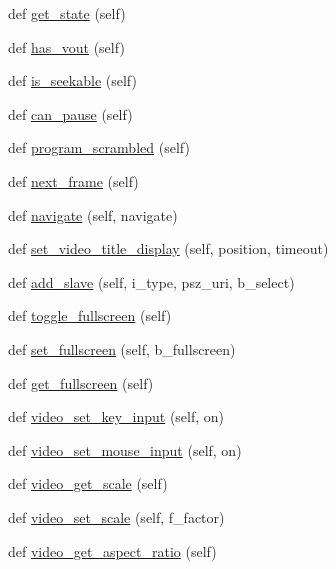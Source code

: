 \begin{DoxyCompactItemize}
def \hyperlink{classvlc_1_1_media_player_adf1f4fd59e6ea40d38c2b677a757007f}{get\+\_\+state} (self)
\item 
def \hyperlink{classvlc_1_1_media_player_a7a943244b82efa08b86d89339de2319c}{has\+\_\+vout} (self)
\item 
def \hyperlink{classvlc_1_1_media_player_aae750b3662aafae640c06bffd15b4c7c}{is\+\_\+seekable} (self)
\item 
def \hyperlink{classvlc_1_1_media_player_a134c27b04cf84027842f7e0a830908e7}{can\+\_\+pause} (self)
\item 
def \hyperlink{classvlc_1_1_media_player_ab21e3e8564c32ce300d90fac7fb18a99}{program\+\_\+scrambled} (self)
\item 
def \hyperlink{classvlc_1_1_media_player_a702101a1321786e2dab4c8a342b73ca0}{next\+\_\+frame} (self)
\item 
def \hyperlink{classvlc_1_1_media_player_ac74a3e90cc0bce1cb4e98a8c95977ffd}{navigate} (self, navigate)
\item 
def \hyperlink{classvlc_1_1_media_player_afb770de67353fac470a84cb5e15366fa}{set\+\_\+video\+\_\+title\+\_\+display} (self, position, timeout)
\item 
def \hyperlink{classvlc_1_1_media_player_a19d8a1e64748a83dced6420ae1d98de8}{add\+\_\+slave} (self, i\+\_\+type, psz\+\_\+uri, b\+\_\+select)
\item 
def \hyperlink{classvlc_1_1_media_player_aadd20ddbe69aacc041317f017debc750}{toggle\+\_\+fullscreen} (self)
\item 
def \hyperlink{classvlc_1_1_media_player_ae0b0d98dfef2ddc6a696b9f04725dade}{set\+\_\+fullscreen} (self, b\+\_\+fullscreen)
\item 
def \hyperlink{classvlc_1_1_media_player_a6493f70d58a5ac4a276d9ce2ea5922bd}{get\+\_\+fullscreen} (self)
\item 
def \hyperlink{classvlc_1_1_media_player_a1b21501a721f11e1adb9009442093707}{video\+\_\+set\+\_\+key\+\_\+input} (self, on)
\item 
def \hyperlink{classvlc_1_1_media_player_a7f6d6677a1da3c8af7bdb6b4e030a857}{video\+\_\+set\+\_\+mouse\+\_\+input} (self, on)
\item 
def \hyperlink{classvlc_1_1_media_player_a2f4f20abf38526de2f6e076c28c7cf3f}{video\+\_\+get\+\_\+scale} (self)
\item 
def \hyperlink{classvlc_1_1_media_player_a7a94d14801fa927f859c65e0af3cbe4f}{video\+\_\+set\+\_\+scale} (self, f\+\_\+factor)
\item 
def \hyperlink{classvlc_1_1_media_player_af56a4698e1e25d37afd746f59fde9b2d}{video\+\_\+get\+\_\+aspect\+\_\+ratio} (self)

\end{DoxyCompactItemize}
